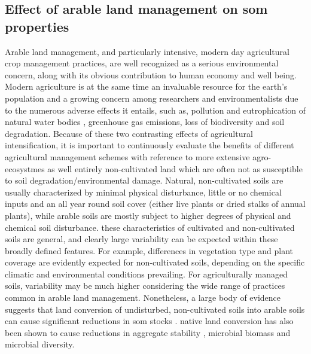 	\subsection{Effect of arable land management on \gls{som} properties}
		Arable land management, and particularly intensive, modern day agricultural crop management practices, are well recognized as a serious environmental concern, along with its obvious contribution to human economy and well being.
		Modern agriculture is at the same time an invaluable resource for the earth’s population and a growing concern among researchers and environmentalists due to the numerous adverse effects it entails, such as, pollution and eutrophication of natural water bodies \citep{liu2012,rabalais2002}, greenhouse gas emissions\citep{vermeulen2012}, loss of biodiversity \citep{laurance2014} and soil degradation\citep{grunwald2011}.
		Because of these two contrasting effects of agricultural intensification, it is important to continuously evaluate the benefits of different agricultural management schemes with reference to more extensive agro-ecosystmes as well entirely non-cultivated land which are often not as susceptible to soil degradation/environmental damage.
		Natural, non-cultivated soils are usually characterized by minimal physical disturbance, little or no chemical inputs and an all year round soil cover (either live plants or dried stalks of annual plants), while arable soils are mostly subject to higher degrees of physical and chemical soil disturbance.
		these characteristics of cultivated and non-cultivated soils are general, and clearly large variability can be expected within these broadly defined features. For example, differences in vegetation type and plant coverage are evidently expected for non-cultivated soils, depending on the specific climatic and environmental conditions prevailing. For agriculturally managed soils, variability may be much higher considering the wide range of practices common in arable land management.
		Nonetheless, a large body of evidence suggests that land conversion of undisturbed, non-cultivated soils into arable soils can cause significant reductions in \gls{som} stocks \citep{ashagrie2007, spaccini2001, ogle2005}.
		native land conversion has also been shown to cause reductions in aggregate stability \citep{bongiovanni2006, cambardella1993,  elliott1986}, microbial biomass \citep{mganga2016, soleimani2019} and microbial diversity\citep{monkai2018}.
